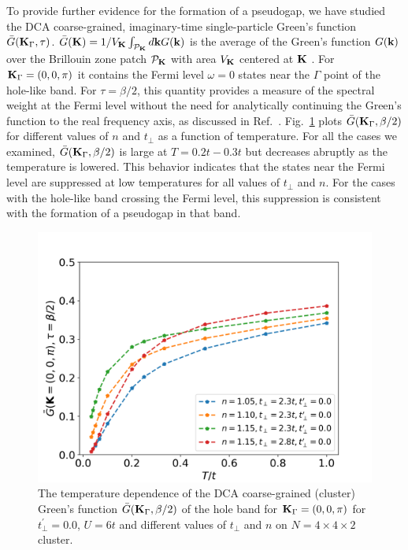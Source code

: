 \documentclass[prb,twocolumn,amsmath,amssymb,superscriptaddress,floatfix,nofootinbib]{revtex4-2}
\begin{document}
To provide further evidence for the formation of a pseudogap, we have studied the DCA coarse-grained, imaginary-time single-particle Green's function ${\bar G}({\bf  K}_\Gamma, \tau)$. ${\bar G}({\bf K}) = 1/V_{\bf K}\int_{{\cal P}_{\bf K}} d{\bf k} G({\bf k})$ is the average of the Green's function $G({\bf k})$ over the Brillouin zone patch ${\cal P}_{\bf K}$ with area $V_{\bf K}$ centered at ${\bf K}$ \cite{Maier_Review}. For ${\bf K}_\Gamma=(0,0,\pi)$ it contains the Fermi level $\omega=0$ states near the $\Gamma$ point of the hole-like band. For $\tau = \beta/2$, this quantity provides a measure of the spectral weight at the Fermi level without the need for analytically continuing the Green's function to the real frequency axis, as discussed in Ref.~\cite{PhysRevLett.75.312}. Fig.~\ref{fig:Gbetahalf} plots ${\bar G}({\bf K}_\Gamma, \beta/2)$ for different values of $n$ and $t_{\perp}$ as a function of temperature. For all the cases we examined, ${\bar G}({\bf K}_\Gamma, \beta/2)$ is large at $T=0.2t-0.3t$ but decreases abruptly as the temperature is lowered. This behavior indicates that the states near the Fermi level are suppressed at low temperatures for all values of $t_\perp$ and $n$. For the cases with the hole-like band crossing the Fermi level, this suppression is consistent with the formation of a pseudogap in that band.

\begin{figure}
\centering
\includegraphics[scale=0.4]{Gbetahalf_k00pi.png}
\caption{
The temperature dependence of the DCA coarse-grained (cluster) Green's function ${\bar G}({\bf K}_\Gamma, \beta/2)$ of the hole band for ${\bf K}_\Gamma = (0,0,\pi)$ for $t_{\perp}^{\prime}=0.0$, $U = 6t$ and different values of $t_{\perp}$ and $n$ on $N = 4\times 4\times 2$ cluster. 
 }
\label{fig:Gbetahalf}
\end{figure}
\end{document}
